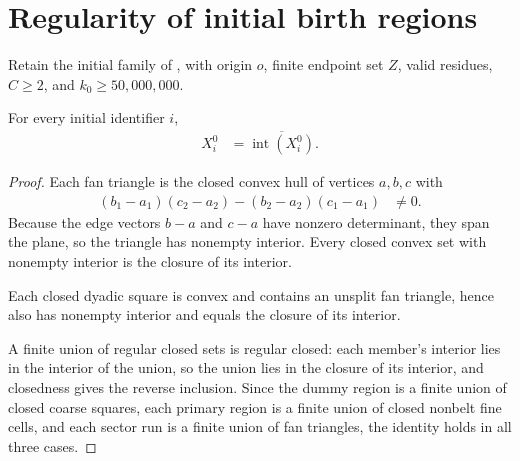 \section{Regularity of initial birth regions}
\label{sec:area_law_initial_region_regularity}

Retain the initial family of \cite[Section~11]{OpenAI2026AreaLaw},
with origin $o$, finite endpoint set $Z$, valid residues,
$C\ge 2$, and $k_0\ge 50{,}000{,}000$.


\begin{lemma}
    \label{thm:area_law_initial_birth_regularity}
    \leanok
    For every initial identifier $i$,
    \begin{align}
        X_i^0 & =\overline{\operatorname{int}(X_i^0)}.
    \end{align}
\end{lemma}
\begin{proof}\leanok
    Each fan triangle is the closed convex hull of vertices $a,b,c$ with
    \begin{align}
        (b_1-a_1)(c_2-a_2)-(b_2-a_2)(c_1-a_1) & \neq 0.
    \end{align}
    Because the edge vectors $b-a$ and $c-a$ have nonzero determinant, they
    span the plane, so the triangle has nonempty interior. Every closed convex
    set with nonempty interior is the closure of its interior.

    Each closed dyadic square is convex and contains an unsplit fan triangle,
    hence also has nonempty interior and equals the closure of its interior.

    A finite union of regular closed sets is regular closed: each member's
    interior lies in the interior of the union, so the union lies in the
    closure of its interior, and closedness gives the reverse inclusion.
    Since the dummy region is a finite union of closed coarse squares, each
    primary region is a finite union of closed nonbelt fine cells, and each
    sector run is a finite union of fan triangles, the identity holds in all
    three cases.
\end{proof}
